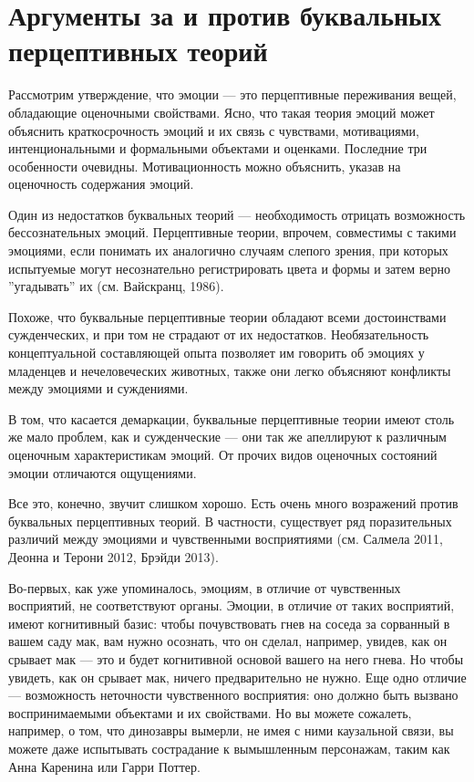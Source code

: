 \documentclass[11pt]{book}
\begin{document}
\section{Аргументы за и против буквальных перцептивных теорий}

Рассмотрим утверждение, что эмоции --- это перцептивные переживания вещей, обладающие оценочными свойствами. Ясно, что такая теория эмоций может объяснить краткосрочность эмоций и их связь с чувствами, мотивациями, интенциональными и формальными объектами и оценками. Последние три особенности очевидны. Мотивационность можно объяснить, указав на оценочность содержания эмоций.

Один из недостатков буквальных теорий --- необходимость отрицать возможность бессознательных эмоций. Перцептивные теории, впрочем, совместимы с такими эмоциями, если понимать их аналогично случаям слепого зрения, при которых испытуемые могут несознательно регистрировать цвета и формы и затем верно ''угадывать'' их (см. Вайскранц, 1986).

Похоже, что буквальные перцептивные теории обладают всеми достоинствами сужденческих, и при том не страдают от их недостатков. Необязательность концептуальной составляющей опыта позволяет им говорить об эмоциях у младенцев и нечеловеческих животных, также они легко объясняют конфликты между эмоциями и суждениями.

В том, что касается демаркации, буквальные перцептивные теории имеют столь же мало проблем, как и сужденческие --- они так же апеллируют к различным оценочным характеристикам эмоций. От прочих видов оценочных состояний эмоции отличаются ощущениями.

Все это, конечно, звучит слишком хорошо. Есть очень много возражений против буквальных перцептивных теорий. В частности, существует ряд поразительных различий между эмоциями и чувственными восприятиями (см. Салмела 2011, Деонна и Терони 2012, Брэйди 2013).

Во-первых, как уже упоминалось, эмоциям, в отличие от чувственных восприятий, не соответствуют органы. Эмоции, в отличие от таких восприятий, имеют когнитивный базис: чтобы почувствовать гнев на соседа за сорванный в вашем саду мак, вам нужно осознать, что он сделал, например, увидев, как он срывает мак --- это и будет когнитивной основой вашего на него гнева. Но чтобы увидеть, как он срывает мак, ничего предварительно не нужно. Еще одно отличие --- возможность неточности чувственного восприятия: оно должно быть вызвано воспринимаемыми объектами и их свойствами. Но вы можете сожалеть, например, о том, что динозавры вымерли, не имея с ними каузальной связи, вы можете даже испытывать сострадание к вымышленным персонажам, таким как Анна Каренина или Гарри Поттер.
\end{document}
